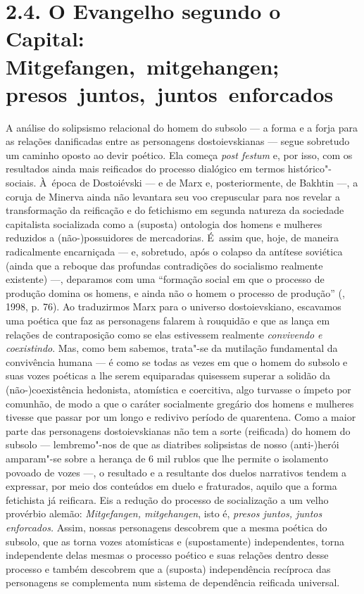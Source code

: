 \section{2.4. O Evangelho segundo o Capital: Mitgefangen,~mitgehangen; presos~juntos,~juntos~enforcados}

A análise do solipsismo relacional do homem do subsolo --- a forma e a
forja para as relações danificadas entre as personagens dostoievskianas
--- segue sobretudo um caminho oposto ao devir poético. Ela começa
\emph{post festum} e, por isso, com os resultados ainda mais reificados
do processo dialógico em termos histórico"-sociais. À~época de
Dostoiévski --- e de Marx e, posteriormente, de Bakhtin ---, a coruja de
Minerva ainda não levantara seu voo crepuscular para nos revelar a
transformação da reificação e do fetichismo em segunda natureza da
sociedade capitalista socializada como a (suposta) ontologia dos homens
e mulheres reduzidos a \mbox{(não-)possuidores} de mercadorias. É~assim que,
hoje, de maneira radicalmente encarniçada --- e, sobretudo, após o
colapso da antítese soviética (ainda que a reboque das profundas
contradições do socialismo realmente existente) ---, deparamos com uma
``formação social em que o processo de produção domina os homens, e
ainda não o homem o processo de produção'' (, 1998, p. 76). Ao
traduzirmos Marx para o universo dostoievskiano, escavamos uma poética
que faz as personagens falarem à rouquidão e que as lança em relações de
contraposição como se elas estivessem realmente \emph{convivendo e
coexistindo}. Mas, como bem sabemos, trata"-se da mutilação fundamental
da convivência humana --- é como se todas as vezes em que o homem do
subsolo e suas vozes poéticas a lhe serem equiparadas quisessem superar
a solidão da \mbox{(não-)coexistência} hedonista, atomística e coercitiva, algo
turvasse o ímpeto por comunhão, de modo a que o caráter socialmente
gregário dos homens e mulheres tivesse que passar por um longo e
redivivo período de quarentena. Como a maior parte das personagens
dostoievskianas não tem a sorte (reificada) do homem do subsolo ---
lembremo"-nos de que as diatribes solipsistas de nosso \mbox{(anti-)herói}
amparam"-se sobre a herança de 6 mil rublos que lhe permite o isolamento
povoado de vozes ---, o resultado e a resultante dos duelos narrativos
tendem a expressar, por meio dos conteúdos em duelo e fraturados, aquilo
que a forma fetichista já reificara. Eis a redução do processo de
socialização a um velho provérbio alemão: \emph{Mitgefangen,
mitgehangen}, isto é, \emph{presos juntos, juntos enforcados.} Assim,
nossas personagens descobrem que a mesma poética do subsolo, que as
torna vozes atomísticas e (supostamente) independentes, torna
independente delas mesmas o processo poético e suas relações dentro
desse processo e também descobrem que a (suposta) independência
recíproca das personagens se complementa num sistema de dependência
reificada universal.

